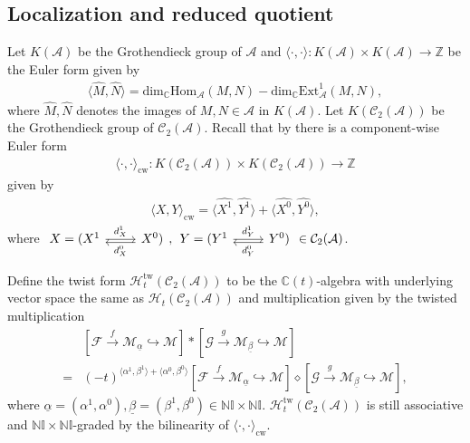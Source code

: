 \documentclass[12pt]{amsart}
\theoremstyle{definition}
\numberwithin{equation}{section}
\begin{document}
\subsection{Localization and reduced quotient}\;
\label{Localization and reduced quotient}

Let $ K(\mathcal{A}) $ be the Grothendieck group of $ \mathcal{A} $ and $ \langle \cdot, \cdot \rangle : K(\mathcal{A}) \times K(\mathcal{A}) \to \mathbb{Z} $ be the Euler form given by
\begin{align*}
    \langle \widehat{M}, \widehat{N} \rangle = \mathrm{dim}_{\mathbb{C}}\mathrm{Hom}_{\mathcal{A}} (M,N) - \mathrm{dim}_{\mathbb{C}}\mathrm{Ext}^1_{\mathcal{A}}(M,N),
\end{align*}
where $ \widehat{M}, \widehat{N} $ denotes the images of $ M, N \in \mathcal{A} $ in $ K(\mathcal{A}) $. 
Let $ K(\mathcal{C}_2(\mathcal{A})) $ be the Grothendieck group of $ \mathcal{C}_2(\mathcal{A}) $. 
Recall that by \cite[Section 4.3]{LP21} there is a component-wise Euler form 
\begin{align*}
    \langle\cdot,\cdot \rangle_{\mathrm{cw}}: K(\mathcal{C}_2(\mathcal{A})) \times K(\mathcal{C}_2(\mathcal{A})) \to \mathbb{Z}
\end{align*}
given by
\begin{align*}
    \langle X, Y \rangle_{\mathrm{cw}} = \langle \widehat{X^1}, \widehat{Y^1} \rangle + \langle \widehat{X^0}, \widehat{Y^0 }\rangle,
\end{align*}
where $ \begin{tikzcd}
    X = (X^1 \arrow[r,"d^1_X"] & X^0 \arrow[l, shift left,"d^0_X"])
\end{tikzcd} , \begin{tikzcd}
    Y = (Y^1 \arrow[r,"d^1_Y"] & Y^0 \arrow[l, shift left,"d^0_Y"])
\end{tikzcd} \in \mathcal{C}_2(\mathcal{A}) $. 

Define the twist form $ \mathcal{H}_t^{\mathrm{tw}}(\mathcal{C}_2(\mathcal{A})) $ to be the $ \mathbb{C}(t) $-algebra with underlying vector space the same as $ \mathcal{H}_t(\mathcal{C}_2(\mathcal{A})) $ and multiplication given by the twisted multiplication
\begin{align*}
    &[\mathcal{F} \xrightarrow{f} \mathcal{M}_{\underline{\alpha}} \hookrightarrow \mathcal{M}] * [\mathcal{G} \xrightarrow{g} \mathcal{M}_{\underline{\beta}} \hookrightarrow \mathcal{M}] \\
    =& (-t)^{\langle \alpha^1,\beta^1 \rangle + \langle \alpha^0,\beta^0 \rangle} [\mathcal{F} \xrightarrow{f} \mathcal{M}_{\underline{\alpha}} \hookrightarrow \mathcal{M}] \diamond [\mathcal{G} \xrightarrow{g} \mathcal{M}_{\underline{\beta}} \hookrightarrow \mathcal{M}],
\end{align*}
where $ \underline{\alpha} = (\alpha^1, \alpha^0), \underline{\beta} = (\beta^1, \beta^0) \in \mathbb{N}\mathbb{I} \times \mathbb{N}\mathbb{I} $. 
$ \mathcal{H}_t^{\mathrm{tw}}(\mathcal{C}_2(\mathcal{A})) $ is still associative and $ \mathbb{N}\mathbb{I} \times \mathbb{N}\mathbb{I} $-graded by the bilinearity of $ \langle \cdot, \cdot \rangle_{\mathrm{cw}} $.
\end{document}
